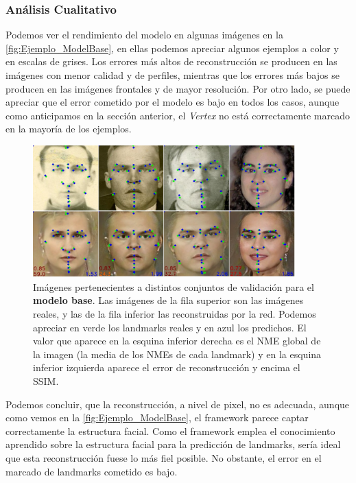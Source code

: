         
        \subsubsection*{Análisis Cualitativo}
        
        \medskip Podemos ver el rendimiento del modelo en algunas imágenes en la \autoref{fig:Ejemplo_ModelBase}, en ellas podemos apreciar algunos ejemplos a color y en escalas de grises. Los errores más altos de reconstrucción se producen en las imágenes con menor calidad y de perfiles, mientras que los errores más bajos se producen en las imágenes frontales y de mayor resolución. Por otro lado, se puede apreciar que el error cometido por el modelo es bajo en todos los casos, aunque como anticipamos en la sección anterior, el \textit{Vertex} no está correctamente marcado en la mayoría de los ejemplos.

        \begin{figure}[H]
            \centering
            \includegraphics[width=0.9\textwidth]{img/image_basemodel.png}
            \caption{Imágenes pertenecientes a distintos conjuntos de validación para el \textbf{modelo base}. Las imágenes de la fila superior son las imágenes reales, y las de la fila inferior las reconstruidas por la red. Podemos apreciar en verde los landmarks reales y  en azul los predichos. El valor que aparece en la esquina inferior derecha es el NME global de la imagen (la media de los NMEs de cada landmark) y en la esquina inferior izquierda aparece el error de reconstrucción y encima el SSIM.}
            \label{fig:Ejemplo_ModelBase}
        \end{figure}

        \noindent Podemos concluir, que la reconstrucción, a nivel de pixel, no es adecuada, aunque como vemos en la \autoref{fig:Ejemplo_ModelBase}, el framework parece captar correctamente la estructura facial. Como el framework emplea el conocimiento aprendido sobre la estructura facial para la predicción de landmarks, sería ideal que esta reconstrucción fuese lo más fiel posible. No obstante, el error en el marcado de landmarks cometido es bajo.


